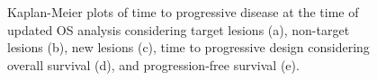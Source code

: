 \begin{figure}
    \centering
    \hfill
    \hfill
    \caption{Kaplan-Meier plots of time to progressive disease at the time of updated OS analysis considering target lesions (a), non-target lesions (b), new lesions (c), time to progressive design considering overall survival (d), and progression-free survival (e).}
\end{figure}


